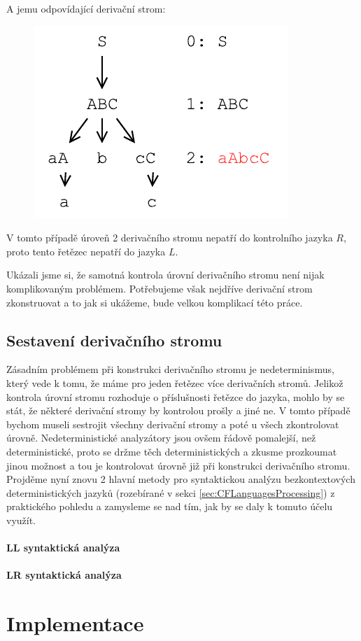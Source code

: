 \begin{exmp}
  \noindent
  A jemu odpovídající derivační strom:
  \begin{figure}[H]
    \centering
    \includegraphics{fig/TreeControlledGrammar2.pdf}
  \end{figure}

  \noindent
  V tomto případě úroveň 2 derivačního stromu nepatří do kontrolního jazyka $R$,
  proto tento řetězec nepatří do jazyka $L$.
\end{exmp}

Ukázali jsme si, že samotná kontrola úrovní derivačního stromu není nijak
komplikovaným problémem. Potřebujeme však nejdříve derivační strom zkonstruovat
a to jak si ukážeme, bude velkou komplikací této práce.

\section{Sestavení derivačního stromu}

Zásadním problémem při konstrukci derivačního stromu je nedeterminismus,
který vede k tomu, že máme pro jeden řetězec více derivačních stromů.
Jelikož kontrola úrovní stromu rozhoduje o příslušnosti řetězce do jazyka,
mohlo by se stát, že některé derivační stromy by kontrolou prošly a jiné ne.
V tomto případě bychom museli sestrojit všechny derivační stromy a poté
u všech zkontrolovat úrovně. Nedeterministické analyzátory jsou ovšem řádově
pomalejší, než deterministické, proto se držme těch deterministických a
zkusme prozkoumat jinou možnost a tou je kontrolovat úrovně již při konstrukci
derivačního stromu.\\

Projděme nyní znovu 2 hlavní metody pro syntaktickou analýzu bezkontextových
deterministických jazyků (rozebírané v sekci \ref{sec:CFLanguagesProcessing})
z praktického pohledu a zamysleme se nad tím, jak by se daly k tomuto účelu
využít.

\subsubsection*{LL syntaktická analýza}



\subsubsection*{LR syntaktická analýza}


\chapter{Implementace}

